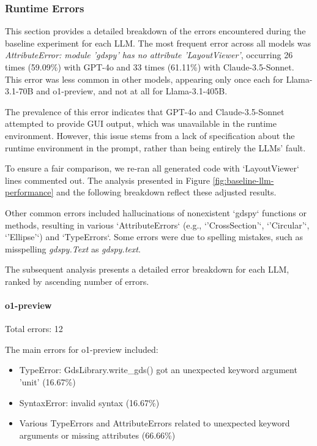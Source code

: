 \documentclass{article}
\begin{document}
\subsubsection{Runtime Errors}
\label{appendix:runtime_errors}

This section provides a detailed breakdown of the errors encountered during the baseline experiment for each LLM. The most frequent error across all models was \textit{AttributeError: module 'gdspy' has no attribute 'LayoutViewer'}, occurring 26 times (59.09\%) with GPT-4o and 33 times (61.11\%) with Claude-3.5-Sonnet. This error was less common in other models, appearing only once each for Llama-3.1-70B and o1-preview, and not at all for Llama-3.1-405B.

The prevalence of this error indicates that GPT-4o and Claude-3.5-Sonnet attempted to provide GUI output, which was unavailable in the runtime environment. However, this issue stems from a lack of specification about the runtime environment in the prompt, rather than being entirely the LLMs' fault.

To ensure a fair comparison, we re-ran all generated code with `LayoutViewer` lines commented out. The analysis presented in Figure \ref{fig:baseline-llm-performance} and the following breakdown reflect these adjusted results.

Other common errors included hallucinations of nonexistent `gdspy` functions or methods, resulting in various `AttributeErrors` (e.g., `'CrossSection'`, `'Circular'`, `'Ellipse'`) and `TypeErrors`. Some errors were due to spelling mistakes, such as misspelling \textit{gdspy.Text} as \textit{gdspy.text}.

The subsequent analysis presents a detailed error breakdown for each LLM, ranked by ascending number of errors.

\paragraph{o1-preview}
Total errors: 12

The main errors for o1-preview included:
\begin{itemize}
    \item TypeError: GdsLibrary.write\_gds() got an unexpected keyword argument 'unit' (16.67\%)
    \item SyntaxError: invalid syntax (16.67\%)
    \item Various TypeErrors and AttributeErrors related to unexpected keyword arguments or missing attributes (66.66\%)
\end{itemize}
\end{document}
